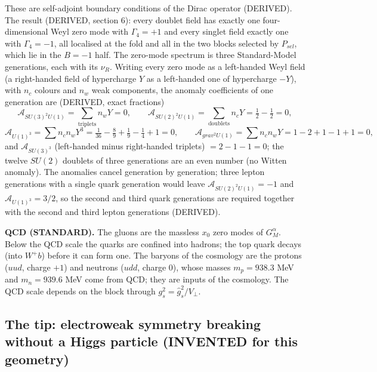 \documentclass[
  10pt,
]{article}
\begin{document}
These are self-adjoint boundary conditions of the Dirac operator
(DERIVED). The result (DERIVED, section 6): every doublet field has
exactly one four-dimensional Weyl zero mode with \(\Gamma_4 = +1\) and
every singlet field exactly one with \(\Gamma_4 = -1\), all localised at
the fold and all in the two blocks selected by \(P_{sel}\), which lie in
the \(B = -1\) half. The zero-mode spectrum is three Standard-Model
generations, each with its \(\nu_R\). Writing every zero mode as a
left-handed Weyl field (a right-handed field of hypercharge \(Y\) as a
left-handed one of hypercharge \(-Y\)), with \(n_c\) colours and \(n_w\)
weak components, the anomaly coefficients of one generation are
(DERIVED, exact fractions)
\[ \mathcal A_{SU(3)^2U(1)} = \sum_{\text{triplets}} n_wY = 0,\qquad \mathcal A_{SU(2)^2U(1)} = \sum_{\text{doublets}} n_cY = \tfrac12 - \tfrac12 = 0,\]
\[ \mathcal A_{U(1)^3} = \sum n_cn_wY^3 = \tfrac1{36} - \tfrac89 + \tfrac19 - \tfrac14 + 1 = 0,\qquad \mathcal A_{grav^2U(1)} = \sum n_cn_wY = 1 - 2 + 1 - 1 + 1 = 0,\]
and \(\mathcal A_{SU(3)^3}\) (left-handed minus right-handed triplets)
\(= 2 - 1 - 1 = 0\); the twelve \(SU(2)\) doublets of three generations
are an even number (no Witten anomaly). The anomalies cancel generation
by generation; three lepton generations with a single quark generation
would leave \(\mathcal A_{SU(2)^2U(1)} = -1\) and
\(\mathcal A_{U(1)^3} = 3/2\), so the second and third quark generations
are required together with the second and third lepton generations
(DERIVED).

\textbf{QCD (STANDARD).} The gluons are the massless \(x_0\) zero modes
of \(G^\alpha_M\). Below the QCD scale the quarks are confined into
hadrons; the top quark decays (into \(W^+b\)) before it can form one.
The baryons of the cosmology are the protons (\(uud\), charge \(+1\))
and neutrons (\(udd\), charge 0), whose masses \(m_p = 938.3\) MeV and
\(m_n = 939.6\) MeV come from QCD; they are inputs of the cosmology. The
QCD scale depends on the block through \(g_s^2 = \hat g_s^2/V_\perp\).

\hypertarget{the-tip-electroweak-symmetry-breaking-without-a-higgs-particle-invented-for-this-geometry}{%
\subsection{The tip: electroweak symmetry breaking without a Higgs
particle (INVENTED for this
geometry)}\label{the-tip-electroweak-symmetry-breaking-without-a-higgs-particle-invented-for-this-geometry}}
\end{document}
